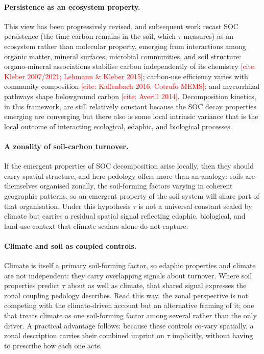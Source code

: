 \documentclass[12pt, a4paper]{article}
\newcommand{\PH}[1]{\textcolor{red}{#1}}
\begin{document}
\paragraph{Persistence as an ecosystem property.}
This view has been progressively revised. \citet{Schmidt2011} and subsequent work
recast SOC persistence (the time carbon remains in the soil, which $\tau$ measures)
as an ecosystem rather than molecular property, emerging from
interactions among organic matter, mineral surfaces, microbial communities, and soil
structure: organo-mineral associations stabilise carbon independently of its chemistry
\PH{[cite: Kleber 2007/2021; Lehmann \& Kleber 2015]}; carbon-use efficiency varies
with community composition \PH{[cite: Kallenbach 2016; Cotrufo MEMS]}; and mycorrhizal
pathways shape belowground carbon \PH{[cite: Averill 2014]}. Decomposition kinetics, in
this framework, are still relatively constant because the SOC decay properties emerging are converging but there also is some local intrinsic variance that is the local outcome of interacting ecological, edaphic, and biological processes.

\paragraph{A zonality of soil-carbon turnover.}
If the emergent properties of SOC decomposition arise locally, then they should carry
spatial structure, and here pedology offers more than an analogy: soils are
themselves organised zonally, the soil-forming factors varying in coherent geographic
patterns, so an emergent property of the soil system will share part of that
organisation. Under this hypothesis $\tau$ is not a universal constant scaled by
climate but carries a residual spatial signal reflecting edaphic, biological, and
land-use context that climate scalars alone do not capture.

\paragraph{Climate and soil as coupled controls.}
Climate is itself a primary soil-forming factor, so edaphic properties and climate are
not independent: they carry overlapping signals about turnover. Where soil properties
predict $\tau$ about as well as climate, that shared signal expresses the zonal
coupling pedology describes. Read this way, the zonal perspective is not competing with the climate-driven account but an alternative framing of it; one that treats
climate as one soil-forming factor among several rather than the only driver. A
practical advantage follows: because these controls co-vary spatially, a zonal
description carries their combined imprint on $\tau$ implicitly, without having to
prescribe how each one acts.
\end{document}
